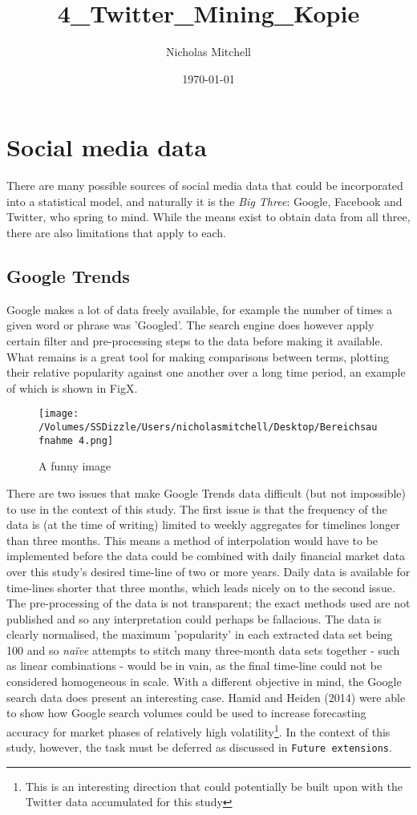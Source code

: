 \documentclass{article}
\author{Nicholas Mitchell}
\date{\today}
\title{4\_Twitter\_Mining\_Kopie}
\begin{document}
\maketitle
\tableofcontents


\section{Social media data}
\label{sec-1}

There are many possible sources of social media data that could be incorporated into a statistical model, and naturally it is the \emph{Big Three}: Google, Facebook and Twitter, who spring to mind. While the means exist to obtain data from all three, there are also limitations that apply to each.


\subsection{Google Trends}
\label{sec-1-1}
Google makes a lot of data freely available, for example the number of times a given word or phrase was 'Googled'. The search engine does however apply certain filter and pre-processing steps to the data before making it available. What remains is a great tool for making comparisons between terms, plotting their relative popularity against one another over a long time period, an example of which is shown in FigX. 

\begin{figure}[htb]
\centering
\texttt{[image: /Volumes/SSDizzle/Users/nicholasmitchell/Desktop/Bereichsaufnahme 4.png]}
\caption{\label{img:funny}A funny image}
\end{figure}

There are two issues that make Google Trends data difficult (but not impossible) to use in the context of this study. The first issue is that the frequency of the data is (at the time of writing) limited to weekly aggregates for timelines longer than three months. This means a method of interpolation would have to be implemented before the data could be combined with daily financial market data over this study's desired time-line of two or more years. Daily data is available for time-lines shorter that three months, which leads nicely on to the second issue. The pre-processing of the data is not transparent; the exact methods used are not published and so any interpretation could perhaps be fallacious. The data is clearly normalised, the maximum 'popularity' in each extracted data set being 100 and so \emph{naïve} attempts to stitch many three-month data sets together - such as linear combinations - would be in vain, as the final time-line could not be considered homogeneous in scale. With a different objective in mind, the Google search data does present an interesting case. Hamid and Heiden (2014) were able to show how Google search volumes could be used to increase forecasting accuracy for market phases of relatively high volatility\footnote{This is an interesting direction that could potentially be built upon with the Twitter data accumulated for this study}. In the context of this study, however, the task must be deferred as discussed in \texttt{Future extensions}.
\end{document}
